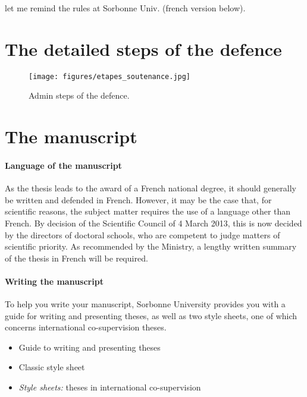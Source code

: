 
let me remind the rules at Sorbonne Univ.
(french version below).

\section{The detailed steps of the defence}
\label{sec:ec:detailed-steps-of-the-defencev}

\begin{figure*}[tp]
    \centering
    \texttt{[image: figures/etapes\_soutenance.jpg]}
    \caption{Admin steps of the defence.}
    \label{fig:etapes-soutenance}
\end{figure*}

\section{The manuscript}
\label{ch:the-manuscript}

\paragraph{Language of the manuscript}

As the thesis leads to the award of a French national degree, it should generally be written and defended in French. However, it may be the case that, for scientific reasons, the subject matter requires the use of a language other than French. By decision of the Scientific Council of 4 March 2013, this is now decided by the directors of doctoral schools, who are competent to judge matters of scientific priority.
As recommended by the Ministry, a lengthy written summary of the thesis in French will be required.

\paragraph{Writing the manuscript}

To help you write your manuscript, Sorbonne University provides you with a guide for writing and presenting theses, as well as two style sheets, one of which concerns international co-supervision theses.

\begin{itemize}
    \item Guide to writing and presenting theses
    \item Classic style sheet
    \item \emph{Style sheets:} theses in international co-supervision
\end{itemize}

